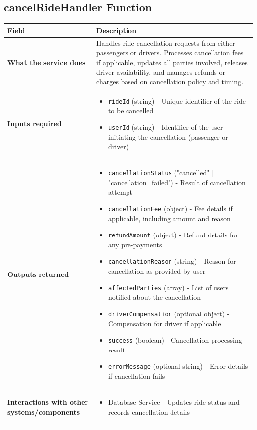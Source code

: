 \documentclass[11pt,a4paper]{article}
\begin{document}
\subsection{cancelRideHandler Function}

\begin{longtable}{|p{3cm}|p{12cm}|}
\hline
\textbf{Field} & \textbf{Description} \\
\hline
\textbf{What the service does} & 
Handles ride cancellation requests from either passengers or drivers. Processes cancellation fees if applicable, updates all parties involved, releases driver availability, and manages refunds or charges based on cancellation policy and timing. \\
\hline
\textbf{Inputs required} & 
\begin{itemize}[nosep]
\item \texttt{rideId} (string) - Unique identifier of the ride to be cancelled
\item \texttt{userId} (string) - Identifier of the user initiating the cancellation (passenger or driver)
\end{itemize} \\
\hline
\textbf{Outputs returned} & 
\begin{itemize}[nosep]
\item \texttt{cancellationStatus} ("cancelled" | "cancellation\_failed") - Result of cancellation attempt
\item \texttt{cancellationFee} (object) - Fee details if applicable, including amount and reason
\item \texttt{refundAmount} (object) - Refund details for any pre-payments
\item \texttt{cancellationReason} (string) - Reason for cancellation as provided by user
\item \texttt{affectedParties} (array) - List of users notified about the cancellation
\item \texttt{driverCompensation} (optional object) - Compensation for driver if applicable
\item \texttt{success} (boolean) - Cancellation processing result
\item \texttt{errorMessage} (optional string) - Error details if cancellation fails
\end{itemize} \\
\hline
\textbf{Interactions with other systems/components} & 
\begin{itemize}[nosep]
\item Database Service - Updates ride status and records cancellation details

\end{itemize}
\end{longtable}
\end{document}
